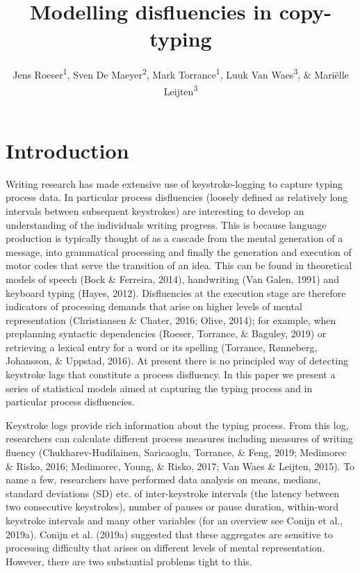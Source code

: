 \documentclass[english,man,floatsintext]{apa7}
\author{Jens Roeser\textsuperscript{1}, Sven De Maeyer\textsuperscript{2}, Mark Torrance\textsuperscript{1}, Luuk Van Waes\textsuperscript{3}, \& Mariëlle Leijten\textsuperscript{3}}
\affiliation{
\vspace{0.5cm}
\textsuperscript{1} Department of Psychology, Nottingham Trent University, United Kingdom\\\textsuperscript{2} Faculty of Social Sciences, University of Antwerp, Belgium\\\textsuperscript{3} Department of Management, University of Antwerp, Belgium}
\title{Modelling disfluencies in copy-typing}
\date{}
\begin{document}
\maketitle

\hypertarget{introduction}{%
\section{Introduction}\label{introduction}}

Writing research has made extensive use of keystroke-logging to capture typing process data. In particular process disfluencies (loosely defined as relatively long intervals between subsequent keystrokes) are interesting to develop an understanding of the individuals writing progress. This is because language production is typically thought of as a cascade from the mental generation of a message, into grammatical processing and finally the generation and execution of motor codes that serve the transition of an idea. This can be found in theoretical models of speech (Bock \& Ferreira, 2014), handwriting (Van Galen, 1991) and keyboard typing (Hayes, 2012). Disfluencies at the execution stage are therefore indicators of processing demands that arise on higher levels of mental representation (Christiansen \& Chater, 2016; Olive, 2014); for example, when preplanning syntactic dependencies (Roeser, Torrance, \& Baguley, 2019) or retrieving a lexical entry for a word or its spelling (Torrance, Rønneberg, Johansson, \& Uppstad, 2016). At present there is no principled way of detecting keystroke lags that constitute a process disfluency. In this paper we present a series of statistical models aimed at capturing the typing process and in particular process disfluencies.

Keystroke logs provide rich information about the typing process. From this log, researchers can calculate different process measures including measures of writing fluency (Chukharev-Hudilainen, Saricaoglu, Torrance, \& Feng, 2019; Medimorec \& Risko, 2016; Medimorec, Young, \& Risko, 2017; Van Waes \& Leijten, 2015). To name a few, researchers have performed data analysis on means, medians, standard deviations (SD) etc. of inter-keystroke intervals (the latency between two consecutive keystrokes), number of pauses or pause duration, within-word keystroke intervals and many other variables (for an overview see Conijn et al., 2019a). Conijn et al. (2019a) suggested that these aggregates are sensitive to processing difficulty that arises on different levels of mental representation. However, there are two substantial problems tight to this.
\end{document}
